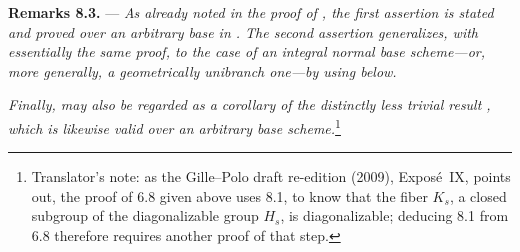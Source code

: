 \medskip
\noindent{}\textbf{Remarks 8.3.} ---
\textit{As already noted in the proof of
, the first assertion is stated
and proved over an arbitrary base in . The second assertion
generalizes, with essentially the same proof, to the case of an integral
normal base scheme---or, more generally, a geometrically unibranch
one---by using  below.}

\textit{Finally,  may also be
regarded as a corollary of the distinctly less trivial result , which
is likewise valid over an arbitrary base scheme.}\footnote{Translator's note:
as the Gille--Polo draft re-edition (2009), Expos\'e~IX, points out, the
proof of 6.8 given above uses 8.1, to know that the fiber \(K_s\), a closed
subgroup of the diagonalizable group \(H_s\), is diagonalizable; deducing 8.1
from 6.8 therefore requires another proof of that step.}
